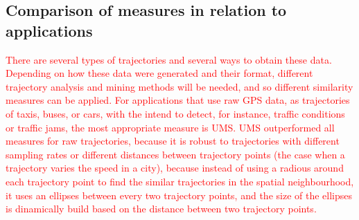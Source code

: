 \documentclass[12pt]{article}
\begin{document}

\subsection{Comparison of measures in relation to applications}
\textcolor{red}{There are several types of trajectories and several ways to obtain these data. Depending on how these data were generated and their format, different  trajectory analysis and mining methods will be needed, and so different similarity measures can be applied. For applications that use raw GPS data, as trajectories of taxis, buses, or cars, with the intend to detect, for instance, traffic conditions or traffic jams, the most appropriate measure is UMS. UMS outperformed all measures for raw trajectories, because it is robust to trajectories with different sampling rates or different distances between trajectory points (the case when a trajectory varies the speed in a city), because instead of using a radious around each trajectory point to find the similar trajectories in the spatial neighbourhood, it uses an ellipses between every two trajectory points, and the size of the ellipses is dinamically build based on the distance between two trajectory points.}
\end{document}
